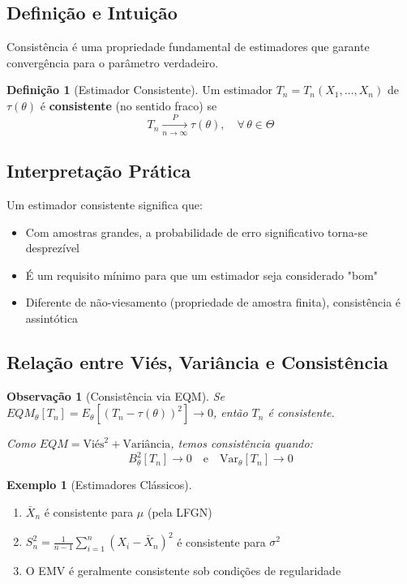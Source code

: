 \documentclass[12pt,a4paper]{article}
\theoremstyle{definition}
\newtheorem{definicao}{Definição}[section]
\newtheorem{exemplo}{Exemplo}[section]
\theoremstyle{plain}
\newtheorem{observacao}{Observação}[section]
\begin{document}
\subsection{Definição e Intuição}

Consistência é uma propriedade fundamental de estimadores que garante convergência para o parâmetro verdadeiro.

\begin{definicao}[Estimador Consistente]
Um estimador $T_n = T_n(X_1, \ldots, X_n)$ de $\tau(\theta)$ é \textbf{consistente} (no sentido fraco) se
\[
T_n \xrightarrow[n \to \infty]{P} \tau(\theta), \quad \forall\, \theta \in \Theta
\]
\end{definicao}

\subsection{Interpretação Prática}

Um estimador consistente significa que:
\begin{itemize}
    \item Com amostras grandes, a probabilidade de erro significativo torna-se desprezível
    \item É um requisito mínimo para que um estimador seja considerado "bom"
    \item Diferente de não-viesamento (propriedade de amostra finita), consistência é assintótica
\end{itemize}

\subsection{Relação entre Viés, Variância e Consistência}

\begin{observacao}[Consistência via EQM]
Se $EQM_\theta[T_n] = E_\theta[(T_n - \tau(\theta))^2] \to 0$, então $T_n$ é consistente.

Como $EQM = \text{Viés}^2 + \text{Variância}$, temos consistência quando:
\[
B_\theta^2[T_n] \to 0 \quad \text{e} \quad \text{Var}_\theta[T_n] \to 0
\]
\end{observacao}

\begin{exemplo}[Estimadores Clássicos]
\begin{enumerate}
    \item $\bar{X}_n$ é consistente para $\mu$ (pela LFGN)
    \item $S_n^2 = \frac{1}{n-1}\sum_{i=1}^n (X_i - \bar{X}_n)^2$ é consistente para $\sigma^2$
    \item O EMV é geralmente consistente sob condições de regularidade
\end{enumerate}
\end{exemplo}
\end{document}
